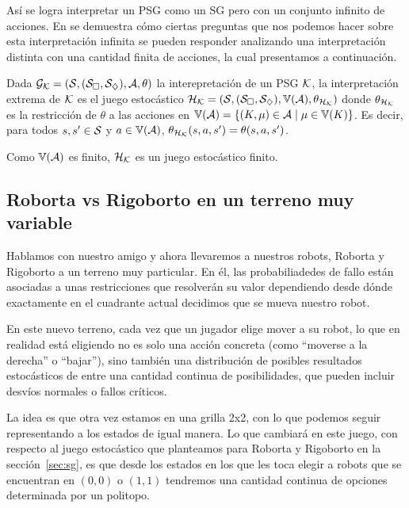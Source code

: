 Así se logra interpretar un PSG como un SG pero con un conjunto infinito de
acciones. En \cite{Polytopal} se demuestra cómo ciertas preguntas que nos
podemos hacer sobre esta interpretación infinita se pueden responder analizando
una interpretación distinta con una cantidad finita de acciones, la cual
presentamos a continuación.

\begin{definition}
	Dada $\mathcal{G}_{\mathcal{K}} = (\mathcal{S}, (\mathcal{S}_\square, \mathcal{S}_\diamondsuit), \mathcal{A}, \theta)$ la interepretación de un PSG $\mathcal{K}$, la interpretación extrema de $\mathcal{K}$ es el juego estocástico $\mathcal{H}_{\mathcal{K}} = (\mathcal{S}, (\mathcal{S}_\square, \mathcal{S}_\diamondsuit), \mathbb{V}(\mathcal{A}), \theta_{\mathcal{H}_{\mathcal{K}}})$ donde $\theta_{\mathcal{H}_{\mathcal{K}}}$ es la restricción de  $\theta$ a las acciones en $\mathbb{V}(\mathcal{A}) = \{(K, \mu) \in \mathcal{A} \mid \mu \in \mathbb{V}(K)\}$. Es decir, para todos $s, s' \in \mathcal{S}$ y $a \in \mathbb{V}(\mathcal{A})$, $\theta_{\mathcal{H}_{\mathcal{K}}}(s, a, s') = \theta(s, a, s')$.

	Como $\mathbb{V}(\mathcal{A})$ es finito, $\mathcal{H}_{\mathcal{K}}$ es un juego estocástico finito.
\end{definition}

\subsection*{Roborta vs Rigoborto en un terreno muy variable}
\label{sec:ejpsg}

Hablamos con nuestro amigo y ahora llevaremos a nuestros robots, Roborta y
Rigoborto a un terreno muy particular. En él, las probabiliadedes de fallo
están asociadas a unas restricciones que resolverán su valor dependiendo desde
dónde exactamente en el cuadrante actual decidimos que se mueva nuestro robot.

En este nuevo terreno, cada vez que un jugador elige mover a su robot, lo que
en realidad está eligiendo no es solo una acción concreta (como ``moverse a la
derecha'' o ``bajar''), sino también una distribución de posibles resultados
estocásticos de entre una cantidad continua de posibilidades, que pueden
incluir desvíos normales o fallos críticos.

La idea es que otra vez estamos en una grilla 2x2, con lo que podemos seguir
representando a los estados de igual manera. Lo que cambiará en este juego, con
respecto al juego estocástico que planteamos para Roborta y Rigoborto en la
sección~\ref{sec:sg}, es que desde los estados en los que les toca elegir a
robots que se encuentran en $(0,0)$ o $(1,1)$ tendremos una cantidad continua
de opciones determinada por un politopo.


